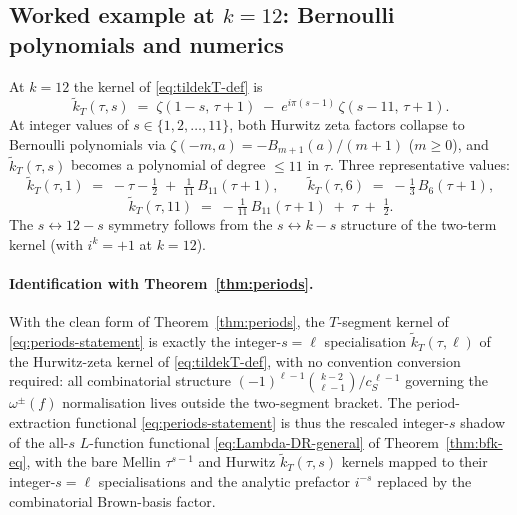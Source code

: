 \documentclass[11pt]{article}
\numberwithin{equation}{section}  %
\begin{document}
\subsection{Worked example at $k = 12$: Bernoulli polynomials and numerics}\label{subsec:k12-worked}

At $k = 12$ the kernel of \eqref{eq:tildekT-def} is
\begin{equation}
  \widetilde{k}_T(\tau, s)
  \;=\; \zeta(1 - s,\,\tau + 1)
  \;-\; e^{i\pi(s-1)}\,\zeta(s - 11,\,\tau + 1).
\end{equation}
At integer values of $s \in \{1, 2, \ldots, 11\}$, both Hurwitz zeta
factors collapse to Bernoulli polynomials via $\zeta(-m, a) =
-B_{m+1}(a)/(m+1)$ ($m \ge 0$), and $\widetilde{k}_T(\tau, s)$
becomes a polynomial of degree $\le 11$ in $\tau$.  Three
representative values:
\begin{equation}
  \widetilde{k}_T(\tau, 1)
  \;=\; -\tau - \tfrac{1}{2} \;+\; \tfrac{1}{11}\,B_{11}(\tau + 1),
  \qquad
  \widetilde{k}_T(\tau, 6)
  \;=\; -\tfrac{1}{3}\,B_6(\tau + 1),
\end{equation}
\begin{equation}
  \widetilde{k}_T(\tau, 11)
  \;=\; -\tfrac{1}{11}\,B_{11}(\tau + 1) \;+\; \tau \;+\; \tfrac{1}{2}.
\end{equation}
The $s \leftrightarrow 12 - s$ symmetry follows from the
$s \leftrightarrow k - s$ structure of the two-term kernel (with
$i^k = +1$ at $k = 12$).

\paragraph{Identification with Theorem~\ref{thm:periods}.}
With the clean form of Theorem~\ref{thm:periods}, the $T$-segment
kernel of \eqref{eq:periods-statement} is exactly the integer-$s = \ell$
specialisation $\widetilde{k}_T(\tau, \ell)$ of the Hurwitz-zeta kernel
of \eqref{eq:tildekT-def}, with no convention conversion required:
all combinatorial structure $(-1)^{\ell - 1}\binom{k - 2}{\ell - 1}/c_S^{\,\ell - 1}$
governing the $\omega^\pm(f)$ normalisation lives outside the
two-segment bracket.  The period-extraction functional
\eqref{eq:periods-statement} is thus the rescaled integer-$s$ shadow
of the all-$s$ $L$-function functional \eqref{eq:Lambda-DR-general}
of Theorem~\ref{thm:bfk-eq}, with the bare Mellin $\tau^{s - 1}$ and
Hurwitz $\widetilde{k}_T(\tau, s)$ kernels mapped to their integer-$s = \ell$
specialisations and the analytic prefactor $i^{-s}$ replaced by the
combinatorial Brown-basis factor.
\end{document}
